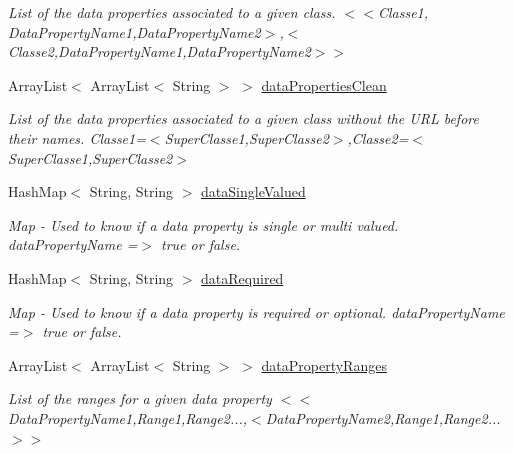 \begin{DoxyCompactItemize}
\begin{DoxyCompactList}\small\item\em List of the data properties associated to a given class.  $<$$<$Classe1, DataPropertyName1,DataPropertyName2$>$,$<$Classe2,DataPropertyName1,DataPropertyName2$>$$>$ \end{DoxyCompactList}\item 
\hypertarget{class_ontology_1_1_data_property_a016e25b09967876b7191033daab24d2c}{
ArrayList$<$ ArrayList$<$ String $>$ $>$ \hyperlink{class_ontology_1_1_data_property_a016e25b09967876b7191033daab24d2c}{dataPropertiesClean}}
\label{class_ontology_1_1_data_property_a016e25b09967876b7191033daab24d2c}

\begin{DoxyCompactList}\small\item\em List of the data properties associated to a given class without the URL before their names.  Classe1=$<$SuperClasse1,SuperClasse2$>$,Classe2=$<$SuperClasse1,SuperClasse2$>$ \end{DoxyCompactList}\item 
\hypertarget{class_ontology_1_1_data_property_a2de9cc72a21e027da8208f9a2df0bd56}{
HashMap$<$ String, String $>$ \hyperlink{class_ontology_1_1_data_property_a2de9cc72a21e027da8208f9a2df0bd56}{dataSingleValued}}
\label{class_ontology_1_1_data_property_a2de9cc72a21e027da8208f9a2df0bd56}

\begin{DoxyCompactList}\small\item\em Map -\/ Used to know if a data property is single or multi valued.  dataPropertyName =$>$ true or false. \end{DoxyCompactList}\item 
\hypertarget{class_ontology_1_1_data_property_aa8750eab83c0207b3acc8b87581e84c7}{
HashMap$<$ String, String $>$ \hyperlink{class_ontology_1_1_data_property_aa8750eab83c0207b3acc8b87581e84c7}{dataRequired}}
\label{class_ontology_1_1_data_property_aa8750eab83c0207b3acc8b87581e84c7}

\begin{DoxyCompactList}\small\item\em Map -\/ Used to know if a data property is required or optional.  dataPropertyName =$>$ true or false. \end{DoxyCompactList}\item 
\hypertarget{class_ontology_1_1_data_property_a9ffdd8ee11bc8c9a2651e512da2485b7}{
ArrayList$<$ ArrayList$<$ String $>$ $>$ \hyperlink{class_ontology_1_1_data_property_a9ffdd8ee11bc8c9a2651e512da2485b7}{dataPropertyRanges}}
\label{class_ontology_1_1_data_property_a9ffdd8ee11bc8c9a2651e512da2485b7}

\begin{DoxyCompactList}\small\item\em List of the ranges for a given data property  $<$$<$DataPropertyName1,Range1,Range2...,$<$DataPropertyName2,Range1,Range2...$>$$>$ \end{DoxyCompactList}\end{DoxyCompactItemize}
